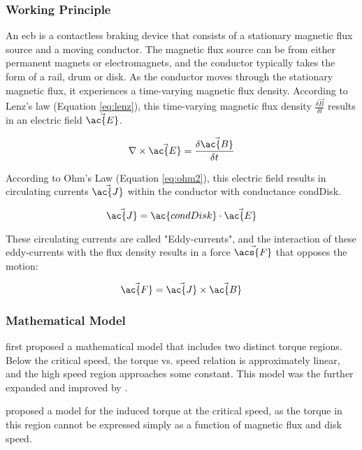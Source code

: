 \subsubsection{Working Principle}

An \acf{ecb} is a contactless braking device that consists of a stationary magnetic flux source and a moving conductor. The magnetic flux source can be from either permanent magnets or electromagnets, and the conductor typically takes the form of a rail, drum or disk. As the conductor moves through the stationary magnetic flux, it experiences a time-varying magnetic flux density. According to Lenz's law (Equation \ref{eq:lenz}), this time-varying magnetic flux density $\frac{\delta\vec{B}}{\delta t}$ results in an electric field $\vec{\ac{E}}$.

\begin{equation}
	\nabla \times \vec{\ac{E}} = \frac{\delta\vec{\ac{B}}}{\delta t}
	\label{eq:lenz}
\end{equation}

According to Ohm's Law (Equation \ref{eq:ohm2}), this electric field results in circulating currents $\vec{\ac{J}}$ within the conductor with conductance \acs{condDisk}.

\begin{equation}
	\vec{\ac{J}} = \ac{condDisk} \cdot \vec{\ac{E}}
	\label{eq:ohm2}
\end{equation}

These circulating currents are called "Eddy-currents", and the interaction of these eddy-currents with the flux density results in a force $\vec{\acs{F}}$ that opposes the motion: \citep{Gay:2005}

\begin{equation}
	\vec{\ac{F}} = \vec{\ac{J}} \times \vec{\ac{B}}
	\label{eq:force}
\end{equation}

\subsubsection{Mathematical Model}

\cite{Smythe:1942} first proposed a mathematical model that includes two distinct torque regions. Below the critical speed, the torque vs. speed relation is approximately linear, and the high speed region approaches some constant. This model was the further expanded and improved by \cite{Smythe:1950}.

\cite{Wouterse:1991} proposed a model for the induced torque at the critical speed, as the torque in this region cannot be expressed simply as a function of magnetic flux and disk speed. 

